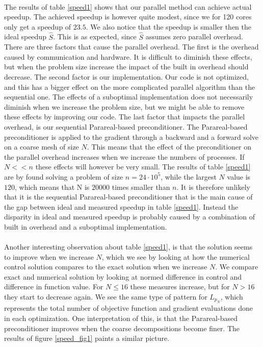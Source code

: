 \noindent
\\
The results of table \ref{speed1} shows that our parallel method can achieve actual speedup. The achieved speedup is however quite modest, since we for 120 cores only get a speedup of $23.5$. We also notice that the speedup is smaller then the ideal speedup $\hat S$. This is as expected, since $\hat S$ assumes zero parallel overhead. There are three factors that cause the parallel overhead. The first is the overhead caused by communication and hardware. It is difficult to diminish these effects, but when the problem size increase the impact of the built in overhead should decrease. The second factor is our implementation. Our code is not optimized, and this has a bigger effect on the more complicated parallel algorithm than the sequential one. The effects of a suboptimal implementation does not necessarily diminish when we increase the problem size, but we might be able to remove these effects by improving our code. The last factor that impacts the parallel overhead, is our sequential Parareal-based preconditioner. The Parareal-based preconditioner is applied to the gradient through a backward and a forward solve on a coarse mesh of size $N$. This means that the effect of the preconditioner on the parallel overhead increases when we increase the numbers of processes. If $N<<n$ these effects will however be very small. The results of table \ref{speed1} are by found solving a problem of size $n=24\cdot 10^5$, while the largest $N$ value is $120$, which means that N is $20000$ times smaller than $n$. It is therefore unlikely that it is the sequential Parareal-based preconditioner that is the main cause of the gap between ideal and measured speedup in table \ref{speed1}. Instead the disparity in ideal and measured speedup is probably caused by a combination of built in overhead and a suboptimal implementation.
\\
\\
Another interesting observation about table \ref{speed1}, is that the solution seems to improve when we increase $N$, which we see by looking at how the numerical control solution compares to the exact solution when we increase $N$. We compare exact and numerical solution by looking at normed difference in control and difference in function value. For $N\leq16$ these measures increase, but for $N>16$ they start to decrease again. We see the same type of pattern for $L_{p_N}$, which represents the total number of objective function and gradient evaluations done in each optimization. One interpretation of this, is that the Parareal-based preconditioner improves when the coarse decompositions become finer. The results of figure \ref{speed_fig1} paints a similar picture.
